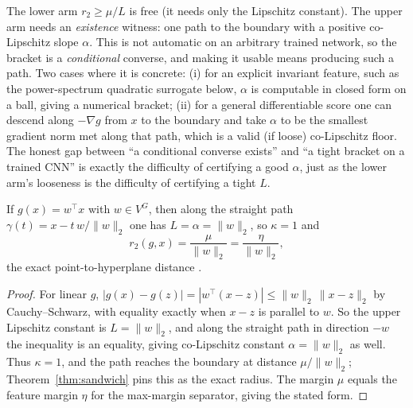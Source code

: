 \begin{remark}
The lower arm $r_2\ge\mu/L$ is free (it needs only the Lipschitz constant). The upper arm needs an
\emph{existence} witness: one path to the boundary with a positive co-Lipschitz slope $\alpha$. This is
not automatic on an arbitrary trained network, so the bracket is a \emph{conditional} converse, and
making it usable means producing such a path. Two cases where it is concrete: (i) for an explicit
invariant feature, such as the power-spectrum quadratic surrogate below, $\alpha$ is computable in
closed form on a ball, giving a numerical bracket; (ii) for a general differentiable score one can
descend along $-\nabla g$ from $x$ to the boundary and take $\alpha$ to be the smallest gradient norm
met along that path, which is a valid (if loose) co-Lipschitz floor. The honest gap between ``a
conditional converse exists'' and ``a tight bracket on a trained CNN'' is exactly the difficulty of
certifying a good $\alpha$, just as the lower arm's looseness is the difficulty of certifying a tight
$L$.
\end{remark}

\begin{corollary}
\label{cor:linear}
If $g(x) = w^\top x$ with $w \in V^G$, then along the straight path $\gamma(t) = x - t\,w/\|w\|_2$ one
has $L = \alpha = \|w\|_2$, so $\kappa = 1$ and
\[
r_2(g,x) = \frac{\mu}{\|w\|_2} = \frac{\eta}{\|w\|_2},
\]
the exact point-to-hyperplane distance \citep{hein2017formal,cortes1995}.
\end{corollary}

\begin{proof}
For linear $g$, $|g(x) - g(z)| = |w^\top(x-z)| \le \|w\|_2\,\|x-z\|_2$ by Cauchy--Schwarz, with
equality exactly when $x-z$ is parallel to $w$. So the upper Lipschitz constant is $L = \|w\|_2$, and
along the straight path in direction $-w$ the inequality is an equality, giving co-Lipschitz constant
$\alpha = \|w\|_2$ as well. Thus $\kappa = 1$, and the path reaches the boundary at distance
$\mu/\|w\|_2$; Theorem~\ref{thm:sandwich} pins this as the exact radius. The margin $\mu$ equals the
feature margin $\eta$ for the max-margin separator, giving the stated form.
\end{proof}

